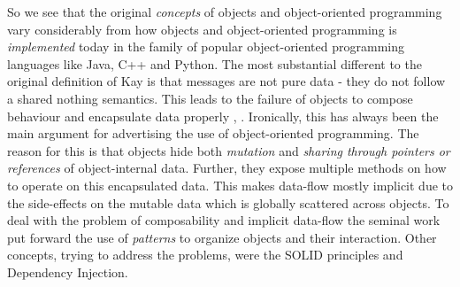 


So we see that the original \textit{concepts} of objects and object-oriented programming vary considerably from how objects and object-oriented programming is \textit{implemented} today in the family of popular object-oriented programming languages like Java, C++ and Python. The most substantial different to the original definition of Kay is that messages are not pure data - they do not follow a shared nothing semantics. This leads to the failure of objects to compose behaviour and encapsulate data properly \cite{bill_what_2017}, \cite{erkki_lindpere_why_2013}. Ironically, this has always been the main argument for advertising the use of object-oriented programming. The reason for this is that objects hide both \textit{mutation} and \textit{sharing through pointers or references} of object-internal data. Further, they expose multiple methods on how to operate on this encapsulated data. This makes data-flow mostly implicit due to the side-effects on the mutable data which is globally scattered across objects. To deal with the problem of composability and implicit data-flow the seminal work \cite{gamma_design_1994} put forward the use of \textit{patterns} to organize objects and their interaction. Other concepts, trying to address the problems, were the SOLID principles and Dependency Injection. 

